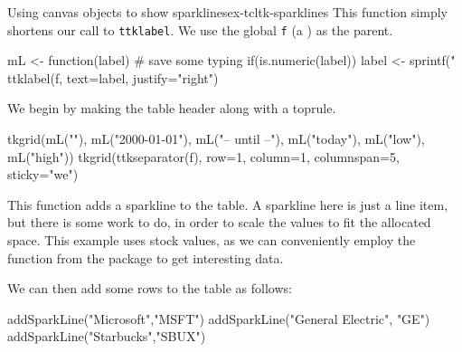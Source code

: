 \begin{example}{Using canvas objects to show sparklines}{ex-tcltk-sparklines}
This function simply shortens our call to \texttt{ttklabel}. We use
the global \texttt{f} (a ) as the parent.
\begin{Schunk}
\begin{Sinput}
 mL <- function(label) { # save some typing
   if(is.numeric(label))
     label <- sprintf("%
   ttklabel(f, text=label, justify="right") 
 }
\end{Sinput}
\end{Schunk}
%
We begin by making the table header along with a toprule.
\begin{Schunk}
\begin{Sinput}
 tkgrid(mL(""), mL("2000-01-01"), mL("-- until --"), 
        mL("today"), mL("low"), mL("high"))
 tkgrid(ttkseparator(f), row=1, column=1, columnspan=5, 
        sticky="we")
\end{Sinput}
\end{Schunk}
%
This function adds a sparkline to the table. A sparkline here is just
a line item, but there is some work to do, in order to scale the
values to fit the allocated space. This example uses stock values, as
we can conveniently employ the  function from
the  package to get interesting data.
\begin{Schunk}
\end{Schunk}

We can then add some rows to the table as follows:
\begin{Schunk}
\begin{Sinput}
 addSparkLine("Microsoft","MSFT")
 addSparkLine("General Electric", "GE")
 addSparkLine("Starbucks","SBUX")
\end{Sinput}
\end{Schunk}
\end{example}

